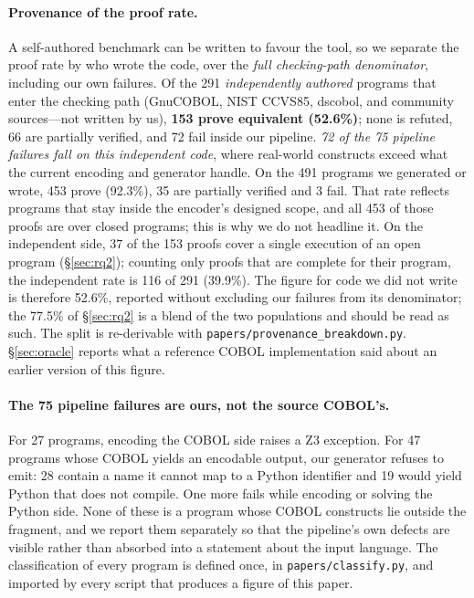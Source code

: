 \documentclass[sigconf,nonacm]{acmart}
\begin{document}
\paragraph{Provenance of the proof rate.} A self-authored benchmark can be written to favour the tool, so we separate the proof rate by who wrote the code, over the \emph{full checking-path denominator}, including our own failures. Of the 291 \emph{independently authored} programs that enter the checking path (GnuCOBOL, NIST CCVS85, dscobol, and community sources---not written by us), \textbf{153 prove equivalent (52.6\%)}; none is refuted, 66 are partially verified, and 72 fail inside our pipeline. \emph{72 of the 75 pipeline failures fall on this independent code}, where real-world constructs exceed what the current encoding and generator handle. On the 491 programs we generated or wrote, 453 prove (92.3\%), 35 are partially verified and 3 fail. That rate reflects programs that stay inside the encoder's designed scope, and all 453 of those proofs are over closed programs; this is why we do not headline it. On the independent side, 37 of the 153 proofs cover a single execution of an open program (\S\ref{sec:rq2}); counting only proofs that are complete for their program, the independent rate is 116 of 291 (39.9\%). The figure for code we did not write is therefore 52.6\%, reported without excluding our failures from its denominator; the 77.5\% of \S\ref{sec:rq2} is a blend of the two populations and should be read as such. The split is re-derivable with \texttt{papers/provenance\_breakdown.py}. \S\ref{sec:oracle} reports what a reference COBOL implementation said about an earlier version of this figure.

\paragraph{The 75 pipeline failures are ours, not the source COBOL's.} For 27 programs, encoding the COBOL side raises a Z3 exception. For 47 programs whose COBOL yields an encodable output, our generator refuses to emit: 28 contain a name it cannot map to a Python identifier and 19 would yield Python that does not compile. One more fails while encoding or solving the Python side. None of these is a program whose COBOL constructs lie outside the fragment, and we report them separately so that the pipeline's own defects are visible rather than absorbed into a statement about the input language. The classification of every program is defined once, in \texttt{papers/classify.py}, and imported by every script that produces a figure of this paper.
\end{document}

